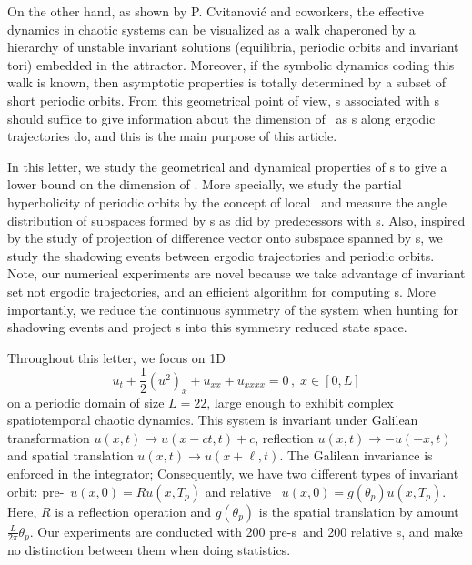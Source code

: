 \documentclass[prl,aps,preprint,showpacs]{revtex4-1} %
\begin{document}
On the other hand,
as shown by P. Cvitanovi\'c and coworkers,
the effective dynamics in chaotic
systems can be visualized as a walk chaperoned
by a hierarchy of unstable invariant solutions (equilibria, periodic orbits
and invariant tori) embedded in the attractor. Moreover,
if the symbolic dynamics coding this walk is known, then asymptotic
properties is totally determined by a subset of short periodic orbits.
From this geometrical
point of view, \Fv s associated with \po s should suffice to give
information about the dimension of \inm\ as \cLv s along ergodic
trajectories do, and this is the main purpose of this article.

In this letter, we study the geometrical and dynamical properties of
\Fv s to give a lower bound on the dimension of \inm. More specially,
we study the partial hyperbolicity
of periodic orbits by the concept
of local \Fe\ and measure the angle distribution of
subspaces formed by \Fv s as did by predecessors with
\cLv s. Also, inspired by the study of projection of difference
vector onto subspace spanned by \cLv s,
we study the shadowing events
between ergodic trajectories and periodic orbits. Note, our
numerical experiments
are novel because we take advantage of invariant set not ergodic
trajectories, and an efficient algorithm for computing
\Fv s. More importantly, we reduce the continuous symmetry
of the system when hunting for shadowing events and project \Fv s
into this symmetry reduced state space.

Throughout this letter, we focus on 1D \KSe{}
\begin{equation}
  u_t+\frac{1}{2}(u^2)_x+u_{xx}+u_{xxxx}=0\,,\; x\in [0,L]
  \label{eq:ks}
\end{equation}
on a periodic domain of size $L=22$, large enough to
exhibit complex spatiotemporal chaotic dynamics.
This system is
invariant under Galilean transformation $u(x,t)\to u(x-ct, t)+c$,
reflection $u(x,t)\to -u(-x,t)$ and spatial translation
$u(x,t) \to u(x+\ell,t)$.
The Galilean invariance is
enforced in the integrator; Consequently, we have two different
types of invariant orbit: pre-\po\  $u(x, 0) = Ru(x,T_p)$
and relative \po\ $u(x, 0) = g(\theta_p)u(x, T_p)$.
Here, $R$ is a reflection operation and $g(\theta_p)$ is the
spatial translation by amount $\frac{L}{2\pi}\theta_p$.
Our experiments are conducted with 200 pre-\po s\ and 200 relative
\po s, and make no distinction between them when doing statistics.
\end{document}
